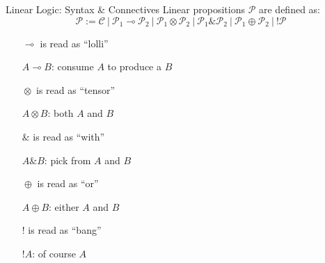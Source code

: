 \documentclass{beamer}
\newcommand{\li}{\!\multimap\!}
\newcommand{\lotimes}{\!\otimes\!}
\newcommand{\loplus}{\!\oplus\!}
\begin{document}
\begin{frame}{Linear Logic: Syntax \& Connectives}
		Linear propositions $\mathcal{P}$ are defined as:
		\[
		\mathcal{P} := \mathcal{C}  \ | \ \mathcal{P}_1 \li \mathcal{P}_2 \ | \ \mathcal{P}_1 \lotimes \mathcal{P}_2 \
		| \ \mathcal{P}_1 \& \mathcal{P}_2 \ 
		| \ \mathcal{P}_1 \loplus \mathcal{P}_2 \ | \ !\mathcal{P}
		\]
	\vfill
	

	\begin{itemize}
		\item[$\li$] is read as ``lolli'' \\
			\begin{flushright}
			\small{$A\li B$: consume $A$ to produce a $B$}
			\end{flushright}		
		\item[$\lotimes$] is read as ``tensor''
			\begin{flushright}
			\small{$A\lotimes B$: both $A$ and $B$}
			\end{flushright}		
		\item[$\&$] is read as ``with''
			\begin{flushright}
			\small{$A\& B$: pick from $A$ and $B$}
			\end{flushright}
		\item[$\loplus$] is read as ``or''
			\begin{flushright}
			\small{$A\loplus B$: either $A$ and $B$}
			\end{flushright}
		\item[$!$] is read as ``bang''
			\begin{flushright}
			\small{$!A$: of course $A$}
			\end{flushright}
	\end{itemize}
\end{frame}
\end{document}

